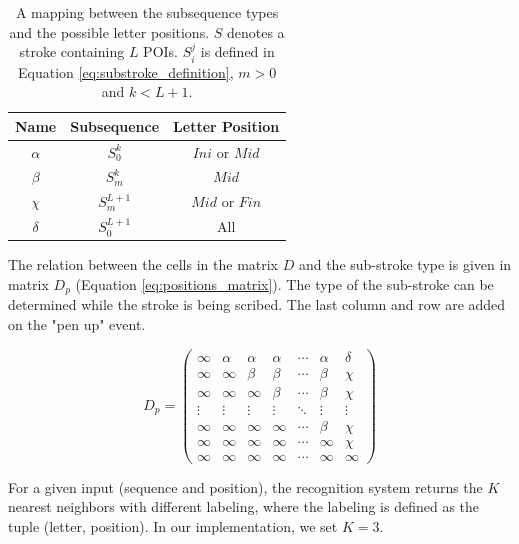 \documentclass[10pt, conference, compsocconf]{IEEEtran}
\begin{document}
\begin{table}
\centering
\renewcommand{\arraystretch}{1.5}
\caption{A mapping between the subsequence types and the possible letter positions. $S$ denotes a stroke containing $L$ POIs. $S_i^j$ is defined in Equation \ref{eq:substroke_definition}, $m>0$ and $k<L+1$. }
\begin{tabular}{| c |c | c |}
\hline
  Name     & Subsequence    & Letter Position       \\
\hline
  $\alpha$ & $S_0^{k}$         & $Ini$ or $Mid$  \\
\hline
  $\beta$  & $S_{m}^{k}$     & $Mid$              \\
\hline
  $\chi$    & $S_{m}^{L+1}$ & $Mid$ or $Fin$   \\
\hline
  $\delta$ & $S_0^{L+1}$     & All                   \\
\hline
\end{tabular}
\label{table:subsequences_types}
\end{table}

The relation between the cells in the matrix $D$ and the sub-stroke type is given in matrix $D_p$  (Equation \ref{eq:positions_matrix}). 
The type of the sub-stroke can be determined while the stroke is being scribed.
The last column and row are added on the "pen up" event.

\begin{equation}
D_{p}=
\left( 
\begin{array}{ccccccc}
\infty 	& \alpha & \alpha & \alpha  & \cdots & \alpha & \delta \\
\infty  & \infty  & \beta   & \beta   & \cdots  & \beta  & \chi    \\
\infty  & \infty  & \infty   & \beta   & \cdots  & \beta  & \chi    \\
\vdots & \vdots & \vdots  & \vdots & \ddots  & \vdots & \vdots \\
\infty  & \infty  & \infty   & \infty   & \cdots  & \beta  & \chi    \\
\infty  & \infty  & \infty   & \infty   & \cdots  & \infty  & \chi    \\
\infty  & \infty  & \infty   & \infty   & \cdots  & \infty  & \infty \end{array} \right)
\label{eq:positions_matrix}
\end{equation}

For a given input (sequence and position), the recognition system returns the $K$ nearest neighbors with different labeling, where the labeling is defined as the tuple (letter, position). In our implementation, we set $K=3$.
\end{document}
